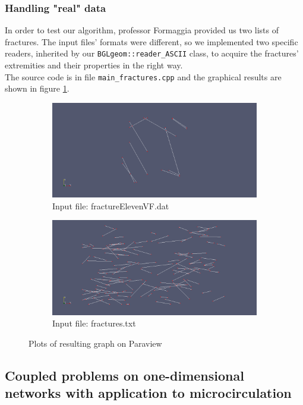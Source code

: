 \documentclass[10pt]{article} %
\begin{document}
	\subsubsection{Handling "real" data}
	In order to test our algorithm, professor Formaggia provided us two lists of fractures. The input files' formats were different, so we implemented two specific readers, inherited by our \texttt{BGLgeom::reader\_ASCII} class, to acquire the fractures' extremities and their properties in the right way. \\
	The source code is in file \texttt{main\_fractures.cpp} and the graphical results are shown in figure \ref{fig:plots_real_fractures}.
	\begin{figure}
		\centering
		\begin{subfigure}{.5\textwidth}
			\centering
			\includegraphics[width=0.97\linewidth]{graph1}
			\caption*{Input file: fractureElevenVF.dat}
		\end{subfigure}%
		\begin{subfigure}{.5\textwidth}
			\centering
			\includegraphics[width=0.97\linewidth]{graph2}
			\caption*{Input file: fractures.txt}
		\end{subfigure}
		\caption{Plots of resulting graph on Paraview}
		\label{fig:plots_real_fractures}
	\end{figure}
	
	\subsection{Coupled problems on one-dimensional networks with application to microcirculation}
	
\end{document}
